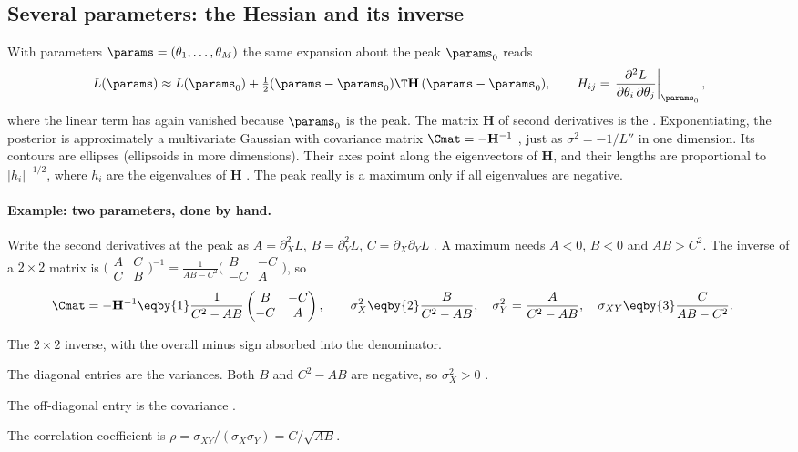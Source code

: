 \subsection{Several parameters: the Hessian and its inverse}

With parameters $\params=(\theta_1,\dots,\theta_M)$ the same expansion about the peak
$\params_0$ reads 
\begin{equation}
  L(\params)\approx L(\params_0)+\tfrac12(\params-\params_0)\T\mathbf H\,(\params-\params_0),
  \qquad H_{ij}=\left.\frac{\partial^2L}{\partial\theta_i\,\partial\theta_j}\right|_{\params_0},
  \label{5b:eq:hessian}
\end{equation}
where the linear term has again vanished because $\params_0$ is the peak. The matrix
$\mathbf H$ of second derivatives is the . Exponentiating, the
posterior is approximately a multivariate Gaussian with covariance matrix
$\Cmat=-\mathbf H^{-1}$ , just as $\sigma^2=-1/L''$ in one
dimension. Its contours are ellipses (ellipsoids in more dimensions). Their axes point
along the eigenvectors of $\mathbf H$, and their lengths are proportional to
$|h_i|^{-1/2}$, where $h_i$ are the eigenvalues of $\mathbf H$ .
The peak really is a maximum only if all eigenvalues are negative.

\paragraph{Example: two parameters, done by hand.}
Write the second derivatives at the peak as $A=\partial_X^2L$, $B=\partial_Y^2L$,
$C=\partial_X\partial_YL$ . A maximum needs $A<0$, $B<0$ and
$AB>C^2$. The inverse of a $2\times2$ matrix is
$\bigl(\begin{smallmatrix}A&C\\C&B\end{smallmatrix}\bigr)^{-1}
=\frac{1}{AB-C^2}\bigl(\begin{smallmatrix}B&-C\\-C&A\end{smallmatrix}\bigr)$, so
\begin{align}
  \Cmat=-\mathbf H^{-1}
  &\eqby{1}\frac{1}{C^2-AB}\begin{pmatrix}B&-C\\-C&A\end{pmatrix},
  \qquad
  \sigma_X^2\eqby{2}\frac{B}{C^2-AB},\quad
  \sigma_Y^2=\frac{A}{C^2-AB},\quad
  \sigma_{XY}\eqby{3}\frac{C}{AB-C^2}.
  \label{5b:eq:cov2}
\end{align}
\begin{explain}
  \item The $2\times2$ inverse, with the overall minus sign absorbed into the
        denominator.
  \item The diagonal entries are the variances. Both $B$ and $C^2-AB$ are negative,
        so $\sigma_X^2>0$ .
  \item The off-diagonal entry is the covariance .
\end{explain}
The correlation coefficient is $\rho=\sigma_{XY}/(\sigma_X\sigma_Y)=C/\sqrt{AB}$.

